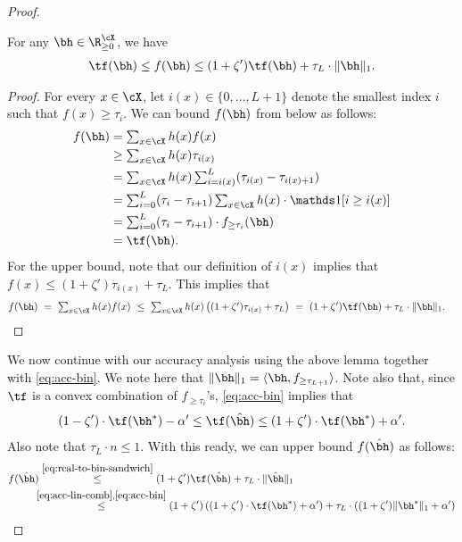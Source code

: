 \begin{proof}
\begin{lemma}
For any $\bh \in \R_{\geq 0}^{\cX}$, we have 
\begin{align} \label{eq:real-to-bin-sandwich}
\tf(\bh) \leq  f(\bh) \leq (1 + \zeta') \tf(\bh) + \tau_L \cdot\|\bh\|_1.
\end{align}
\end{lemma}
\begin{proof}
For every $x \in \cX$, let $i(x) \in \{0, \dots, L+1\}$ denote the smallest index $i$ such that $f(x) \geq \tau_i$. We can bound $f(\bh)$ from below as follows:
\begin{align*}
f(\bh) &\textstyle= \sum_{x \in \cX} h(x) f(x) \\
&\textstyle\geq \sum_{x \in \cX} h(x) \tau_{i(x)} \\
&\textstyle= \sum_{x \in \cX} h(x) \sum_{i = i(x)}^{L} (\tau_{i(x)} - \tau_{i(x) + 1}) \\
&\textstyle= \sum_{i=0}^L (\tau_i - \tau_{i + 1}) \sum_{x \in \cX} h(x) \cdot \ind[i \geq i(x)] \\
&\textstyle= \sum_{i=0}^L (\tau_i - \tau_{i + 1}) \cdot f_{\geq \tau_i}(\bh) \\
&\textstyle= \tf(\bh).
\end{align*}
For the upper bound, note that our definition of $i(x)$ implies that $f(x) \leq (1 + \zeta') \tau_{i(x)} + \tau_L$. This implies that
\begin{align*}
f(\bh) &\textstyle~=~ \sum_{x \in \cX} h(x) f(x)
\textstyle~\leq~ \sum_{x \in \cX} h(x) \left((1 + \zeta') \tau_{i(x)} + \tau_L\right)
\textstyle~=~ (1 + \zeta') \tf(\bh) + \tau_L \cdot \|\bh\|_1.
\end{align*}
\end{proof}
We now continue with our accuracy analysis using the above lemma together with \eqref{eq:acc-bin}. We note here that $\|\bh\|_1 = \langle\bh, f_{\geq \tau_{L+1}}\rangle$. Note also that, since $\tf$ is a convex combination of $f_{\geq \tau_i}$'s, \eqref{eq:acc-bin} implies that
\begin{align} \label{eq:acc-lin-comb}
(1 - \zeta') \cdot \tf(\bh^{\ast}) - \alpha' \leq  \tf(\hbh) \leq (1 + \zeta') \cdot \tf(\bh^{\ast}) + \alpha'.
\end{align}
Also note that $\tau_{L} \cdot n \le 1$. With this ready, we can upper bound $f(\hbh)$ as follows:
\begin{align*}
f(\hbh) &\overset{\eqref{eq:real-to-bin-sandwich}}{\leq}  (1 + \zeta') \tf(\hbh) + \tau_L \cdot \|\hbh\|_1 \\
&\!\!\!\overset{\eqref{eq:acc-lin-comb}, \eqref{eq:acc-bin}}{\leq}  (1 + \zeta') \left((1 + \zeta') \cdot \tf(\bha) + \alpha'\right) + \tau_L \cdot \left((1 + \zeta') \|\bha\|_1 + \alpha'\right) \\

\end{align*}
\end{proof}
